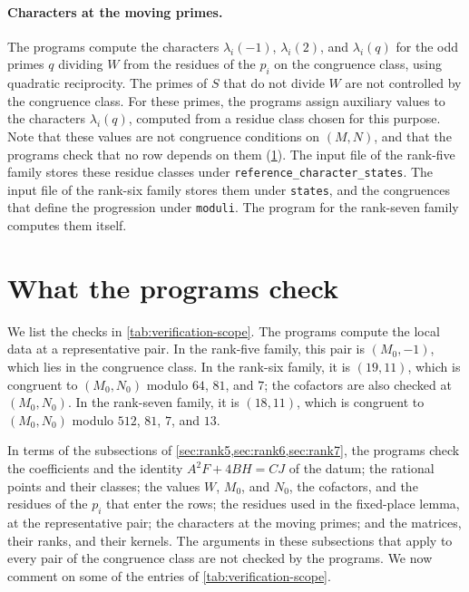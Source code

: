 \paragraph{Characters at the moving primes.} The programs compute the characters $\lambda_i(-1)$, $\lambda_i(2)$, and $\lambda_i(q)$ for the odd primes $q$ dividing $W$ from the residues of the $p_i$ on the congruence class, using quadratic reciprocity. The primes of $S$ that do not divide $W$ are not controlled by the congruence class. For these primes, the programs assign auxiliary values to the characters $\lambda_i(q)$, computed from a residue class chosen for this purpose. Note that these values are not congruence conditions on $(M,N)$, and that the programs check that no row depends on them (\cref{sec:verification-scope}). The input file of the rank-five family stores these residue classes under \texttt{reference\_character\_states}. The input file of the rank-six family stores them under \texttt{states}, and the congruences that define the progression under \texttt{moduli}. The program for the rank-seven family computes them itself.

\section{What the programs check}\label{sec:verification-scope}

We list the checks in \cref{tab:verification-scope}. The programs compute the local data at a representative pair. In the rank-five family, this pair is $(M_0,-1)$, which lies in the congruence class. In the rank-six family, it is $(19,11)$, which is congruent to $(M_0,N_0)$ modulo $64$, $81$, and $7$; the cofactors are also checked at $(M_0,N_0)$. In the rank-seven family, it is $(18,11)$, which is congruent to $(M_0,N_0)$ modulo $512$, $81$, $7$, and $13$.

In terms of the subsections of \cref{sec:rank5,sec:rank6,sec:rank7}, the programs check the coefficients and the identity $A^2F+4BH=CJ$ of the datum; the rational points and their classes; the values $W$, $M_0$, and $N_0$, the cofactors, and the residues of the $p_i$ that enter the rows; the residues used in the fixed-place lemma, at the representative pair; the characters at the moving primes; and the matrices, their ranks, and their kernels. The arguments in these subsections that apply to every pair of the congruence class are not checked by the programs. We now comment on some of the entries of \cref{tab:verification-scope}.

